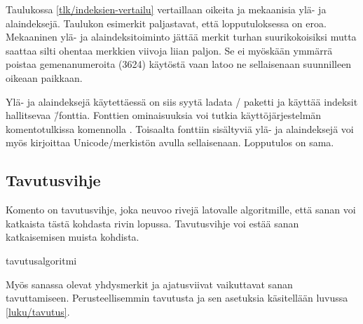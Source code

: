 
Taulukossa \ref{tlk/indeksien-vertailu} vertaillaan oikeita ja
mekaanisia ylä- ja alaindeksejä. Taulukon esimerkit paljastavat, että
lopputuloksessa on eroa. Mekaaninen ylä- ja alaindeksitoiminto jättää
merkit turhan suurikokoisiksi mutta saattaa silti ohentaa merkkien
viivoja liian paljon. Se ei myöskään ymmärrä poistaa gemenanumeroita
(3624) käytöstä vaan latoo ne sellaisenaan suunnilleen oikeaan paikkaan.

Ylä- ja alaindeksejä käytettäessä on siis syytä ladata
\-/ paketti ja käyttää indeksit hallitsevaa
 \=/fonttia. Fonttien ominaisuuksia voi tutkia
käyttöjärjestelmän komentotulkissa komennolla . Toisaalta
fonttiin sisältyviä ylä- ja alaindeksejä voi myös kirjoittaa
Unicode\-/merkistön avulla sellaisenaan. Lopputulos on sama.

\subsection{Tavutusvihje}

Komento \komentom{-} on tavutusvihje, joka neuvoo rivejä latovalle
algoritmille, että sanan voi katkaista tästä kohdasta rivin lopussa.
Tavutusvihje voi estää sanan katkaisemisen muista kohdista.

\begin{koodilohkosis}
tavutus\-algo\-ritmi
\end{koodilohkosis}

\noindent
Myös sanassa olevat yhdysmerkit ja ajatusviivat vaikuttavat sanan
tavuttamiseen. Perusteellisemmin tavutusta ja sen asetuksia käsitellään
luvussa \ref{luku/tavutus}.


